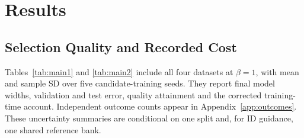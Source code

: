 \documentclass[make,article,submit,pdftex,moreauthors]{Definitions/mdpi}
\begin{document}
\section{Results}\label{sec:results}

\subsection{Selection Quality and Recorded Cost}
Tables~\ref{tab:main1} and \ref{tab:main2} include all four datasets at
$\beta=1$, with mean and sample SD over five candidate-training seeds.
They report final model widths, validation and test error, quality
attainment and the corrected training-time account. Independent outcome
counts appear in Appendix~\ref{app:outcomes}. These uncertainty summaries
are conditional on one split and, for ID guidance, one shared reference
bank.
\end{document}
